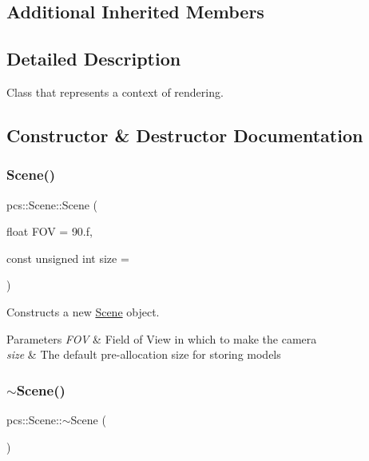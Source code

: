 \subsection*{Additional Inherited Members}


\subsection{Detailed Description}
Class that represents a context of rendering. 

\subsection{Constructor \& Destructor Documentation}
\mbox{\label{classpcs_1_1Scene_afb195a01eafa527bdc7fc8239bebd7a6}} 
\subsubsection{\texorpdfstring{Scene()}{Scene()}}
{\footnotesize\ttfamily pcs\+::\+Scene\+::\+Scene (\begin{DoxyParamCaption}\item[{float}]{F\+OV = {\ttfamily 90.f},  }\item[{const unsigned int}]{size = {} }\end{DoxyParamCaption})}



Constructs a new \hyperlink{classpcs_1_1Scene}{Scene} object. 


\begin{DoxyParams}{Parameters}
{\em F\+OV} & Field of View in which to make the camera \\
\hline
{\em size} & The default pre-\/allocation size for storing models \\
\hline
\end{DoxyParams}
\mbox{\label{classpcs_1_1Scene_a106aca266becd518d47821e08a87cf6f}} 
\subsubsection{\texorpdfstring{$\sim$\+Scene()}{~Scene()}}
{\footnotesize\ttfamily pcs\+::\+Scene\+::$\sim$\+Scene (\begin{DoxyParamCaption}{ }\end{DoxyParamCaption})\hspace{0.3cm}{\ttfamily [virtual]}}



